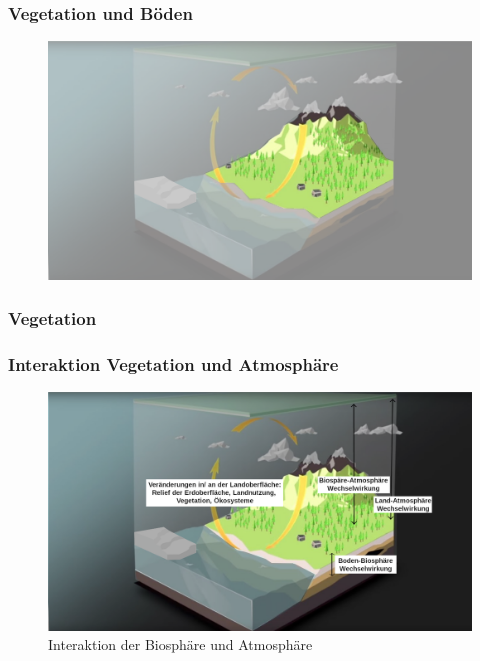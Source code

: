 \begin{frame}
	\frametitle{Vegetation und Böden}
	
	\begin{figure}
		\centering
		\includegraphics{bilder/WMO_Cycles_land.png}
		\caption{}
	\end{figure}
\end{frame}

\begin{frame}
	\frametitle{Vegetation}
\end{frame}


\begin{frame}
	\frametitle{Interaktion Vegetation und Atmosphäre}
	
		\begin{figure}
		\centering
		\includegraphics{bilder/WMO_Cycles_factors_landAndGround.png}
		\caption{Interaktion der Biosphäre und Atmosphäre}
	\end{figure}

\end{frame}



